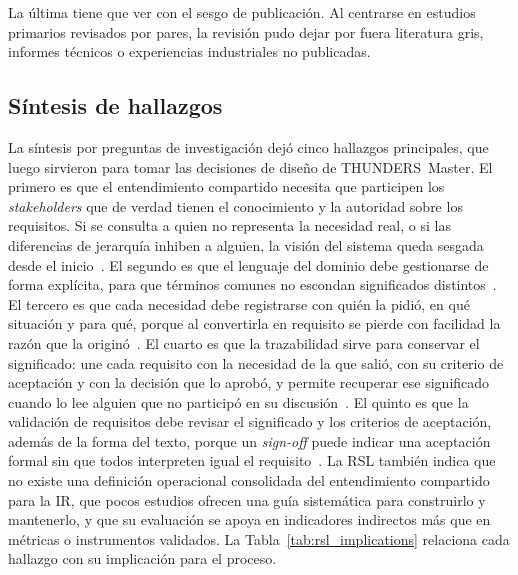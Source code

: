 \documentclass[12pt,letterpaper,oneside]{report}
\begin{document}
La última tiene que ver con el sesgo de publicación. Al
centrarse en estudios primarios revisados por pares, la revisión pudo dejar por
fuera literatura gris, informes técnicos o experiencias industriales no
publicadas.

\subsection{Síntesis de hallazgos}
La síntesis por preguntas de investigación dejó cinco hallazgos principales,
que luego sirvieron para tomar las decisiones de diseño de THUNDERS~Master. El
primero es que el entendimiento compartido necesita que participen los
\textit{stakeholders} que de verdad tienen el conocimiento y la autoridad sobre
los requisitos. Si se consulta a quien no representa la necesidad real, o si las
diferencias de jerarquía inhiben a alguien, la visión del sistema queda sesgada
desde el inicio~\cite{khan2022stakeholders,alsanoosy2019power}. El
segundo es que el lenguaje del dominio debe gestionarse de forma explícita, para
que términos comunes no escondan significados
distintos~\cite{antonelli2016,ribeiro2020,calefato2015}. El tercero es que cada necesidad debe registrarse con quién la pidió, en qué
situación y para qué, porque al convertirla en requisito se pierde con facilidad
la razón que la originó~\cite{laporte2023,kunz2016}. El cuarto es que la
trazabilidad sirve para conservar el significado: une cada requisito con la
necesidad de la que salió, con su criterio de aceptación y con la decisión que
lo aprobó, y permite recuperar ese significado cuando lo lee alguien que no
participó en su discusión~\cite{behutiye2022quality,pacheco2022,fricker2015}. El
quinto es que la validación de requisitos debe revisar el significado y los criterios de
aceptación, además de la forma del texto, porque un \textit{sign-off} puede
indicar una aceptación formal sin que todos interpreten igual el
requisito~\cite{gentili2025,laporte2023,irshad2021bdd}. La RSL también indica que no existe una definición
operacional consolidada del entendimiento compartido para la IR, que pocos
estudios ofrecen una guía sistemática para construirlo y mantenerlo, y que su
evaluación se apoya en indicadores indirectos más que en métricas o
instrumentos validados. La Tabla~\ref{tab:rsl_implications} relaciona cada
hallazgo con su implicación para el proceso.
\end{document}
